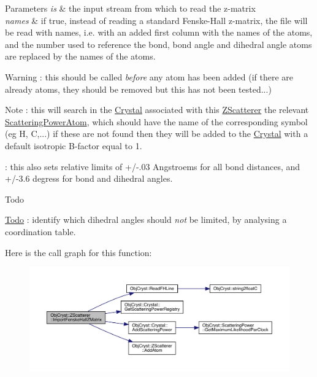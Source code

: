 \begin{DoxyParams}{Parameters}
{\em is} & the input stream from which to read the z-\/matrix \\
\hline
{\em names} & if true, instead of reading a standard Fenske-\/\+Hall z-\/matrix, the file will be read with names, i.\+e. with an added first column with the names of the atoms, and the number used to reference the bond, bond angle and dihedral angle atoms are replaced by the names of the atoms.\\
\hline
\end{DoxyParams}
\begin{DoxyWarning}{Warning}
\+: this should be called {\itshape before} any atom has been added (if there are already atoms, they should be removed but this has not been tested...)
\end{DoxyWarning}
\begin{DoxyNote}{Note}
\+: this will search in the \mbox{\hyperlink{class_obj_cryst_1_1_crystal}{Crystal}} associated with this \mbox{\hyperlink{class_obj_cryst_1_1_z_scatterer}{Z\+Scatterer}} the relevant \mbox{\hyperlink{class_obj_cryst_1_1_scattering_power_atom}{Scattering\+Power\+Atom}}, which should have the name of the corresponding symbol (eg \textquotesingle{}H\textquotesingle{}, \textquotesingle{}C\textquotesingle{},...) if these are not found then they will be added to the \mbox{\hyperlink{class_obj_cryst_1_1_crystal}{Crystal}} with a default isotropic B-\/factor equal to 1. 

\+: this also sets relative limits of +/-\/.03 Angstroems for all bond distances, and +/-\/3.6 degress for bond and dihedral angles. 
\end{DoxyNote}
\begin{DoxyRefDesc}{Todo}
\item[\mbox{\hyperlink{todo__todo000016}{Todo}}]\+: identify which dihedral angles should {\itshape not} be limited, by analysing a coordination table. \end{DoxyRefDesc}
Here is the call graph for this function\+:
\nopagebreak
\begin{figure}[H]
\begin{center}
\leavevmode
\includegraphics[width=350pt]{class_obj_cryst_1_1_z_scatterer_a097d27206e6e54259bb987a06d65f71c_cgraph}
\end{center}
\end{figure}
\mbox{\label{class_obj_cryst_1_1_z_scatterer_abfce23ff84b572acf371cb9dc8cdb09f}} 
